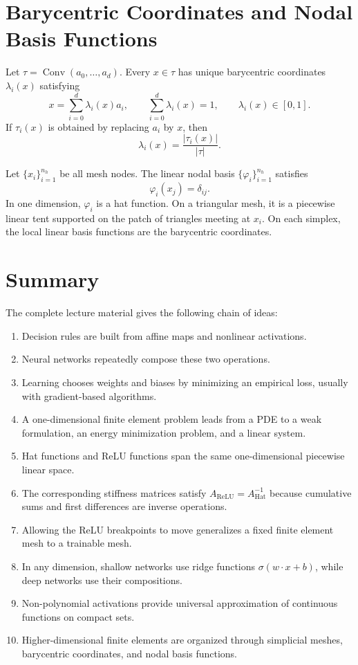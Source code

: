 \documentclass[11pt,a4paper]{article}
\newcommand{\Conv}{\operatorname{Conv}}
\newcommand{\Ah}{A_{\mathrm{Hat}}}
\newcommand{\Ar}{A_{\mathrm{ReLU}}}
\theoremstyle{definition}
\theoremstyle{plain}
\theoremstyle{remark}
\begin{document}
\section{Barycentric Coordinates and Nodal Basis Functions}

Let $\tau=\Conv(a_0,\ldots,a_d)$. Every $x\in\tau$ has unique barycentric coordinates $\lambda_i(x)$ satisfying
\[
  x=\sum_{i=0}^d\lambda_i(x)a_i,
  \qquad
  \sum_{i=0}^d\lambda_i(x)=1,
  \qquad
  \lambda_i(x)\in[0,1].
\]
If $\tau_i(x)$ is obtained by replacing $a_i$ by $x$, then
\[
  \lambda_i(x)=\frac{|\tau_i(x)|}{|\tau|}.
\]

Let $\{x_i\}_{i=1}^{n_h}$ be all mesh nodes. The linear nodal basis $\{\varphi_i\}_{i=1}^{n_h}$ satisfies
\[
  \varphi_i(x_j)=\delta_{ij}.
\]
In one dimension, $\varphi_i$ is a hat function. On a triangular mesh, it is a piecewise linear tent supported on the patch of triangles meeting at $x_i$. On each simplex, the local linear basis functions are the barycentric coordinates.

\section{Summary}

The complete lecture material gives the following chain of ideas:
\begin{enumerate}
  \item Decision rules are built from affine maps and nonlinear activations.
  \item Neural networks repeatedly compose these two operations.
  \item Learning chooses weights and biases by minimizing an empirical loss, usually with gradient-based algorithms.
  \item A one-dimensional finite element problem leads from a PDE to a weak formulation, an energy minimization problem, and a linear system.
  \item Hat functions and ReLU functions span the same one-dimensional piecewise linear space.
  \item The corresponding stiffness matrices satisfy $\Ar=\Ah^{-1}$ because cumulative sums and first differences are inverse operations.
  \item Allowing the ReLU breakpoints to move generalizes a fixed finite element mesh to a trainable mesh.
  \item In any dimension, shallow networks use ridge functions $\sigma(w\cdot x+b)$, while deep networks use their compositions.
  \item Non-polynomial activations provide universal approximation of continuous functions on compact sets.
  \item Higher-dimensional finite elements are organized through simplicial meshes, barycentric coordinates, and nodal basis functions.
\end{enumerate}
\end{document}
